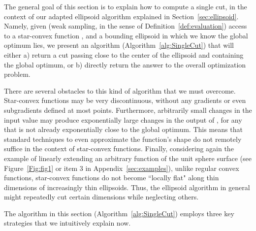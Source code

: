 \documentclass[11pt,letter]{article}
\numberwithin{nTheorems}{section}
\begin{document}
The general goal of this section is to explain how to compute a single cut, in the context of our adapted ellipsoid algorithm explained in Section~\ref{sec:ellipsoid}.
Namely, given (weak sampling, in the sense of Definition~\ref{def:evaluation}) access to a star-convex function , and a bounding ellipsoid in which we know the global optimum lies, we present an algorithm (Algorithm~\ref{alg:SingleCut}) that will either a) return a cut passing close to the center of the ellipsoid and containing the global optimum, or b) directly return the answer to the overall optimization problem.

There are several obstacles to this kind of algorithm that we must overcome.
Star-convex functions may be very discontinuous, without any gradients or even subgradients defined at most points.
Furthermore, arbitrarily small changes in the input value  may produce exponentially large changes in the output of , for any  that is not already exponentially close to the global optimum.
This means that standard techniques to even approximate the function's shape do not remotely suffice in the context of star-convex functions.
Finally, considering again the example of linearly extending an arbitrary function of the unit sphere surface (see Figure~\ref{Fig:fig1} or item 3 in Appendix~\ref{sec:examples}), unlike regular convex functions, star-convex functions do not become ``locally flat" along thin dimensions of increasingly thin ellipsoids.
Thus, the ellipsoid algorithm in general might repeatedly cut certain dimensions while neglecting others.

The algorithm in this section (Algorithm~\ref{alg:SingleCut}) employs three key strategies that we intuitively explain now.
\end{document}

